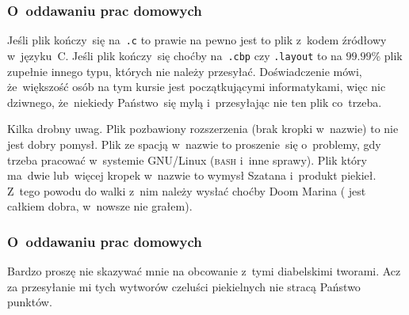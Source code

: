 \documentclass[10pt,t]{beamer}
\begin{document}
\begin{frame}
  \frametitle{O~oddawaniu prac domowych}


  Jeśli plik kończy~się na~\texttt{.c} to prawie na pewno jest to plik
  z~kodem źródłowy w~języku~C. Jeśli plik kończy~się choćby
  na~\texttt{.cbp} czy \texttt{.layout} to na $99.99$\% plik zupełnie
  innego typu, których nie należy przesyłać. Doświadczenie mówi,
  że~większość osób na tym kursie jest początkującymi informatykami, więc
  nic dziwnego, że~niekiedy Państwo~się mylą i~przesyłając nie ten plik
  co~trzeba.

  Kilka drobny uwag. Plik pozbawiony rozszerzenia (brak kropki w~nazwie) to
  nie jest dobry pomysł. Plik ze spacją w~nazwie to proszenie~się
  o~problemy, gdy trzeba pracować w~systemie GNU/Linux (\textsc{bash}
  i~inne sprawy). Plik który ma~dwie lub~więcej kropek w~nazwie to wymysł
  Szatana i~produkt piekieł. Z~tego powodu do walki z~nim należy wysłać
  choćby Doom Marina
  ( jest całkiem dobra, w~nowsze nie grałem).

\end{frame}





\begin{frame}
  \frametitle{O~oddawaniu prac domowych}


  Bardzo proszę nie skazywać mnie na obcowanie z~tymi diabelskimi tworami.
  Acz za przesyłanie mi tych wytworów czeluści piekielnych nie stracą
  Państwo punktów.

\end{frame}
\end{document}
